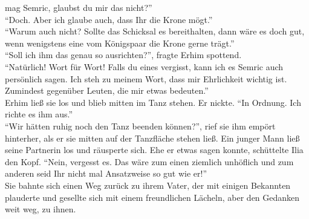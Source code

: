 mag Semric, glaubst du mir das nicht?''\\
``Doch. Aber ich glaube auch, dass Ihr die Krone mögt.''\\
``Warum auch nicht? Sollte das Schicksal es bereithalten, dann wäre es doch gut, wenn wenigstens 
eine vom Königspaar die Krone gerne trägt.''\\
``Soll ich ihm das genau so ausrichten?'', fragte Erhim spottend.\\
``Natürlich! Wort für Wort! Falls du eines vergisst, kann ich es Semric auch persönlich sagen. Ich 
steh zu meinem Wort, dass mir Ehrlichkeit wichtig ist. Zumindest gegenüber Leuten, die mir etwas 
bedeuten.''\\
Erhim ließ sie los und blieb mitten im Tanz stehen. Er nickte. ``In Ordnung. Ich richte es ihm 
aus.''\\
``Wir hätten ruhig noch den Tanz beenden können?'', rief sie ihm empört hinterher, als er sie 
mitten auf der Tanzfläche stehen ließ. Ein junger Mann ließ seine Partnerin los und räusperte sich. 
Ehe er etwas sagen konnte, schüttelte Ilia den Kopf. ``Nein, vergesst es. Das wäre zum einen 
ziemlich unhöflich und zum anderen seid Ihr nicht mal Ansatzweise so gut wie er!''\\
Sie bahnte sich einen Weg zurück zu ihrem Vater, der mit einigen Bekannten plauderte und gesellte 
sich mit einem freundlichen Lächeln, aber den Gedanken weit weg, zu ihnen.\\

